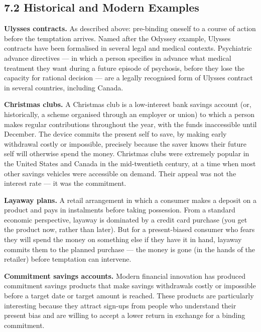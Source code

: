 \documentclass[12pt, letterpaper]{article}
\begin{document}
\subsection{7.2 Historical and Modern Examples}


\textbf{Ulysses contracts.} As described above: pre-binding oneself to a course of action before the temptation arrives. Named after the Odyssey example, Ulysses contracts have been formalised in several legal and medical contexts. Psychiatric advance directives --- in which a person specifies in advance what medical treatment they want during a future episode of psychosis, before they lose the capacity for rational decision --- are a legally recognised form of Ulysses contract in several countries, including Canada.

\textbf{Christmas clubs.} A Christmas club is a low-interest bank savings account (or, historically, a scheme organised through an employer or union) to which a person makes regular contributions throughout the year, with the funds inaccessible until December. The device commits the present self to save, by making early withdrawal costly or impossible, precisely because the saver knows their future self will otherwise spend the money. Christmas clubs were extremely popular in the United States and Canada in the mid-twentieth century, at a time when most other savings vehicles were accessible on demand. Their appeal was not the interest rate --- it was the commitment.

\textbf{Layaway plans.} A retail arrangement in which a consumer makes a deposit on a product and pays in instalments before taking possession. From a standard economic perspective, layaway is dominated by a credit card purchase (you get the product now, rather than later). But for a present-biased consumer who fears they will spend the money on something else if they have it in hand, layaway commits them to the planned purchase --- the money is gone (in the hands of the retailer) before temptation can intervene.

\textbf{Commitment savings accounts.} Modern financial innovation has produced commitment savings products that make savings withdrawals costly or impossible before a target date or target amount is reached. These products are particularly interesting because they attract sign-ups from people who understand their present bias and are willing to accept a lower return in exchange for a binding commitment.
\end{document}
